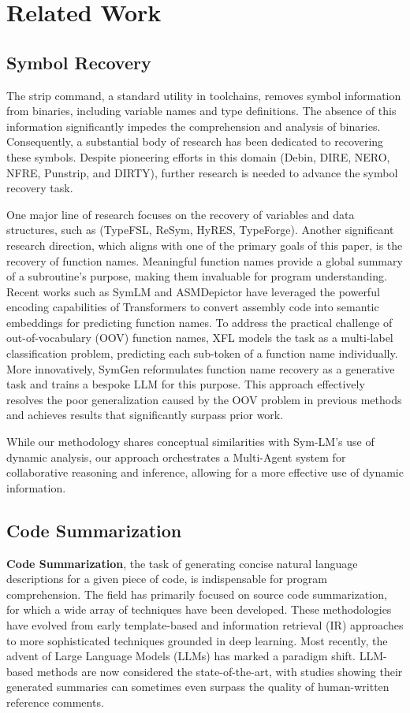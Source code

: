\documentclass[acmsmall,screen,review,anonymous]{acmart} %
\begin{document}
\section{Related Work}
\subsection{Symbol Recovery}

The strip command, a standard utility in toolchains, removes symbol information from binaries, including variable names and type definitions. The absence of this information significantly impedes the comprehension and analysis of binaries. Consequently, a substantial body of research has been dedicated to recovering these symbols. Despite pioneering efforts in this domain (Debin, DIRE, NERO, NFRE, Punstrip, and DIRTY), further research is needed to advance the symbol recovery task.

One major line of research focuses on the recovery of variables and data structures, such as (TypeFSL, ReSym, HyRES, TypeForge). Another significant research direction, which aligns with one of the primary goals of this paper, is the recovery of function names. Meaningful function names provide a global summary of a subroutine's purpose, making them invaluable for program understanding. Recent works such as SymLM and ASMDepictor have leveraged the powerful encoding capabilities of Transformers to convert assembly code into semantic embeddings for predicting function names. To address the practical challenge of out-of-vocabulary (OOV) function names, XFL models the task as a multi-label classification problem, predicting each sub-token of a function name individually. More innovatively, SymGen reformulates function name recovery as a generative task and trains a bespoke LLM for this purpose. This approach effectively resolves the poor generalization caused by the OOV problem in previous methods and achieves results that significantly surpass prior work.

While our methodology shares conceptual similarities with Sym-LM's use of dynamic analysis, our approach orchestrates a Multi-Agent system for collaborative reasoning and inference, allowing for a more effective use of dynamic information.

\subsection{Code Summarization}
\textbf{Code Summarization}, the task of generating concise natural language descriptions for a given piece of code, is indispensable for program comprehension. The field has primarily focused on source code summarization, for which a wide array of techniques have been developed. These methodologies have evolved from early template-based and information retrieval (IR) approaches to more sophisticated techniques grounded in deep learning. Most recently, the advent of Large Language Models (LLMs) has marked a paradigm shift. LLM-based methods are now considered the state-of-the-art, with studies showing their generated summaries can sometimes even surpass the quality of human-written reference comments.
\end{document}
